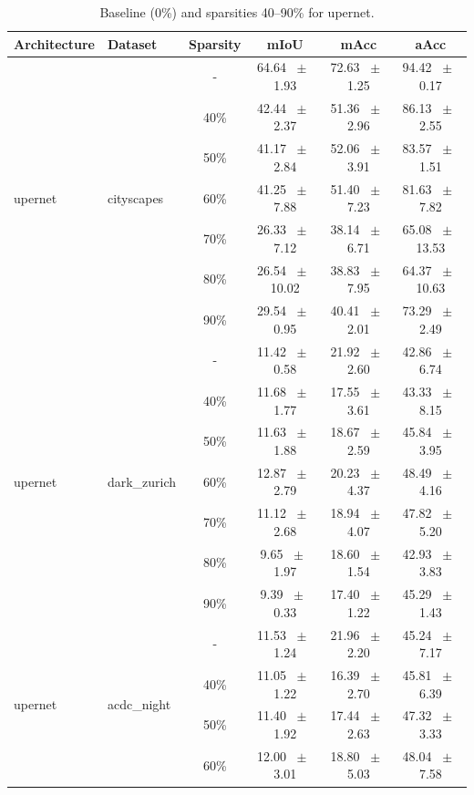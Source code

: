 \begin{table}[h]
  \centering
  \caption{Baseline (0\%) and sparsities 40--90\% for upernet.}
  \begin{tabular}{@{}l l c c c c@{}}
    \toprule
    Architecture & Dataset & Sparsity & mIoU & mAcc & aAcc \\
    \midrule
    \multirow{7}{*}{upernet} & \multirow{7}{*}{cityscapes} & - & 64.64 ~$\pm$~ 1.93 & 72.63 ~$\pm$~ 1.25 & 94.42 ~$\pm$~ 0.17 \\
    & & 40\% & 42.44 ~$\pm$~ 2.37 & 51.36 ~$\pm$~ 2.96 & 86.13 ~$\pm$~ 2.55 \\
    & & 50\% & 41.17 ~$\pm$~ 2.84 & 52.06 ~$\pm$~ 3.91 & 83.57 ~$\pm$~ 1.51 \\
    & & 60\% & 41.25 ~$\pm$~ 7.88 & 51.40 ~$\pm$~ 7.23 & 81.63 ~$\pm$~ 7.82 \\
    & & 70\% & 26.33 ~$\pm$~ 7.12 & 38.14 ~$\pm$~ 6.71 & 65.08 ~$\pm$~ 13.53 \\
    & & 80\% & 26.54 ~$\pm$~ 10.02 & 38.83 ~$\pm$~ 7.95 & 64.37 ~$\pm$~ 10.63 \\
    & & 90\% & 29.54 ~$\pm$~ 0.95 & 40.41 ~$\pm$~ 2.01 & 73.29 ~$\pm$~ 2.49 \\
    \midrule
    \multirow{7}{*}{upernet} & \multirow{7}{*}{dark_zurich} & - & 11.42 ~$\pm$~ 0.58 & 21.92 ~$\pm$~ 2.60 & 42.86 ~$\pm$~ 6.74 \\
    & & 40\% & 11.68 ~$\pm$~ 1.77 & 17.55 ~$\pm$~ 3.61 & 43.33 ~$\pm$~ 8.15 \\
    & & 50\% & 11.63 ~$\pm$~ 1.88 & 18.67 ~$\pm$~ 2.59 & 45.84 ~$\pm$~ 3.95 \\
    & & 60\% & 12.87 ~$\pm$~ 2.79 & 20.23 ~$\pm$~ 4.37 & 48.49 ~$\pm$~ 4.16 \\
    & & 70\% & 11.12 ~$\pm$~ 2.68 & 18.94 ~$\pm$~ 4.07 & 47.82 ~$\pm$~ 5.20 \\
    & & 80\% & 9.65 ~$\pm$~ 1.97 & 18.60 ~$\pm$~ 1.54 & 42.93 ~$\pm$~ 3.83 \\
    & & 90\% & 9.39 ~$\pm$~ 0.33 & 17.40 ~$\pm$~ 1.22 & 45.29 ~$\pm$~ 1.43 \\
    \midrule
    \multirow{7}{*}{upernet} & \multirow{7}{*}{acdc_night} & - & 11.53 ~$\pm$~ 1.24 & 21.96 ~$\pm$~ 2.20 & 45.24 ~$\pm$~ 7.17 \\
    & & 40\% & 11.05 ~$\pm$~ 1.22 & 16.39 ~$\pm$~ 2.70 & 45.81 ~$\pm$~ 6.39 \\
    & & 50\% & 11.40 ~$\pm$~ 1.92 & 17.44 ~$\pm$~ 2.63 & 47.32 ~$\pm$~ 3.33 \\
    & & 60\% & 12.00 ~$\pm$~ 3.01 & 18.80 ~$\pm$~ 5.03 & 48.04 ~$\pm$~ 7.58 \\

\end{tabular}
\end{table}
